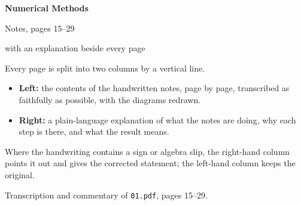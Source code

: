 \documentclass[10pt,a4paper]{article}
\begin{document}
\begin{titlepage}
\centering
\vspace*{2.2cm}
{\Huge\bfseries Numerical Methods\par}
\vspace{0.4cm}
{\LARGE Notes, pages 15--29\par}
\vspace{0.5cm}
{\Large with an explanation beside every page\par}
\vspace{1.6cm}

\begin{minipage}{0.78\textwidth}
\begin{ideabox}
Every page is split into two columns by a vertical line.
\begin{itemize}
\item \textbf{Left:} the contents of the handwritten notes, page by page,
transcribed as faithfully as possible, with the diagrams redrawn.
\item \textbf{Right:} a plain-language explanation of what the notes are
doing, why each step is there, and what the result means.
\end{itemize}
Where the handwriting contains a sign or algebra slip, the right-hand
column points it out and gives the corrected statement; the left-hand
column keeps the original.
\end{ideabox}
\end{minipage}

\vfill
{\small Transcription and commentary of \texttt{01.pdf}, pages 15--29.}
\end{titlepage}

\end{document}
